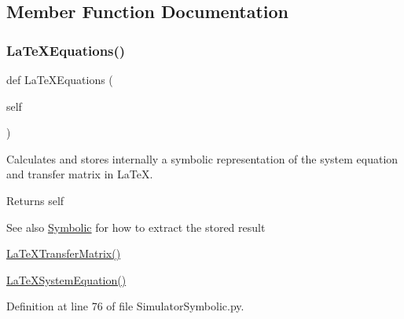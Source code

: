 \subsection{Member Function Documentation}
\mbox{\label{classSignalIntegrity_1_1SystemDescriptions_1_1SimulatorSymbolic_1_1SimulatorSymbolic_a3f6cd3290ceb07e8985e1eb832be3934}} 
\subsubsection{\texorpdfstring{La\+Te\+X\+Equations()}{LaTeXEquations()}}
{\footnotesize\ttfamily def La\+Te\+X\+Equations (\begin{DoxyParamCaption}\item[{}]{self }\end{DoxyParamCaption})}



Calculates and stores internally a symbolic representation of the system equation and transfer matrix in La\+TeX. 

\begin{DoxyReturn}{Returns}
self 
\end{DoxyReturn}
\begin{DoxySeeAlso}{See also}
\hyperlink{namespaceSignalIntegrity_1_1SystemDescriptions_1_1Symbolic}{Symbolic} for how to extract the stored result 

\hyperlink{classSignalIntegrity_1_1SystemDescriptions_1_1SimulatorSymbolic_1_1SimulatorSymbolic_adc83c150e43916083e3379cd4b9bb80e}{La\+Te\+X\+Transfer\+Matrix()} 

\hyperlink{classSignalIntegrity_1_1SystemDescriptions_1_1SystemDescriptionSymbolic_1_1SystemDescriptionSymbolic_ab91378c2a97ec0d38ee1c70988142eb5}{La\+Te\+X\+System\+Equation()} 
\end{DoxySeeAlso}


Definition at line 76 of file Simulator\+Symbolic.\+py.

